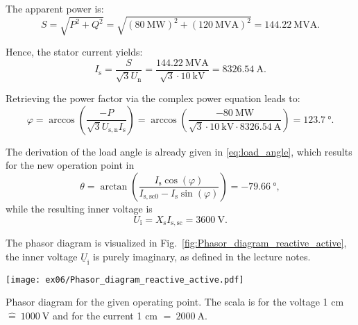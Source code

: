 \begin{solutionblock}
    
    The apparent power is:
    \begin{equation}
        S = \sqrt{P^2+Q^2}
        = \sqrt{\left(\SI{80}{\mega\watt}\right)^2 + \left(\SI{120}{\mega\volt\ampere}\right)^2}
        = \SI{144.22}{\mega\volt\ampere}.
    \end{equation}

    Hence, the stator current yields:
    \begin{equation}
        I_{\mathrm{s}} = \frac{S}{\sqrt{3}U_{\mathrm{n}}}
        = \frac{\SI{144.22}{\mega\volt\ampere}}{\sqrt{3}\cdot\SI{10}{\kilo\volt}}
        = \SI{8326.54}{\ampere}.
    \end{equation}

    Retrieving the power factor via the complex power equation leads to:
    \begin{equation}
        \varphi = \arccos\left(\frac{-P}{\sqrt{3}U_{\mathrm{s,n}}I_{\mathrm{s}}} \right)
        = \arccos\left(\frac{-\SI{80}{\mega\watt}}{\sqrt{3}\cdot\SI{10}{\kilo\volt}\cdot\SI{8326.54}{\ampere}}\right)
        = \SI{123.7}{\degree}.
    \end{equation}

    The derivation of the load angle is already given in \eqref{eq:load_angle}, which results for the new operation point in
    \begin{equation}
        \theta = \arctan\left(\frac{I_{\mathrm{s}}\cos(\varphi)}{I_{\mathrm{s,sc0}}-I_{\mathrm{s}}\sin(\varphi)}\right)
        = \SI{-79.66}{\degree},
    \end{equation}
    while the resulting inner voltage is
    \begin{equation}
        U_{\mathrm{i}} = X_{\mathrm{s}} I_{\mathrm{s,sc}}
        = \SI{3600}{\volt}.
    \end{equation}

    The phasor diagram is visualized in Fig.~\ref{fig:Phasor_diagram_reactive_active}, the inner voltage $\underline{U}_{\mathrm{i}}$ is purely imaginary, as defined in the lecture notes.
    \begin{solutionfigure}
        \centering
        \texttt{[image: ex06/Phasor\_diagram\_reactive\_active.pdf]}
        \caption{Phasor diagram for the given operating point. The scala is for the voltage 1 cm $\widehat{=}~ \SI{1000}{\volt}$ and for the current 1 cm $\widehat{=}~ \SI{2000}{\ampere}$.}
        \label{fig:Phasor_diagram_reactive_active}
    \end{solutionfigure}


\end{solutionblock}



